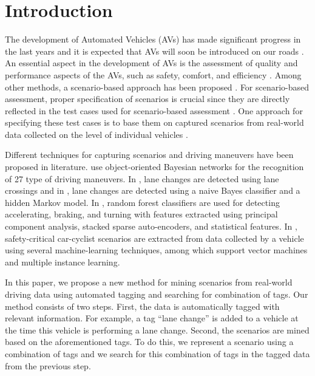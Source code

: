 \section{Introduction}
\label{sec:introduction}

\cstarta
The development of Automated Vehicles (AVs) has made significant progress in the last years and it is expected that AVs will soon be introduced on our roads \autocite{bimbraw2015autonomous, madni2018autonomous}. 
An essential aspect in the development of AVs is the assessment of quality and performance aspects of the AVs, such as safety, comfort, and efficiency \autocite{bengler2014threedecades, stellet2015taxonomy}. 
Among other methods, a scenario-based approach has been proposed \autocite{elrofai2018scenario, putz2017pegasus}. 
For scenario-based assessment, proper specification of scenarios is crucial since they are directly reflected in the test cases used for scenario-based assessment \autocite{stellet2015taxonomy}. 
One approach for specifying these test cases is to base them on captured scenarios from real-world data collected on the level of individual vehicles \autocite{elrofai2018scenario, putz2017pegasus, roesener2016scenariobased, deGelder2017assessment}. 

Different techniques for capturing scenarios and driving maneuvers have been proposed in literature. 
\textcite{kasper2012oobayesnetworks} use object-oriented Bayesian networks for the recognition of 27 type of driving maneuvers. 
In \autocite{krajewski2018highD}, lane changes are detected using lane crossings and in \autocite{schlechtriemen2015lanechange}, lane changes are detected using a naive Bayes classifier and a hidden Markov model. 
In \cite{xie2017driving}, random forest classifiers are used for detecting accelerating, braking, and turning with features extracted using principal component analysis, stacked sparse auto-encoders, and statistical features.
In \autocite{cara2015carcyclist}, safety-critical car-cyclist scenarios are extracted from data collected by a vehicle using several machine-learning techniques, among which support vector machines and multiple instance learning.

In this paper, we propose a new method for mining scenarios from real-world driving data using automated tagging and searching for combination of tags. 
Our method consists of two steps. 
First, the data is automatically tagged with relevant information. For example, a tag ``lane change'' is added to a vehicle at the time this vehicle is performing a lane change. 
Second, the scenarios are mined based on the aforementioned tags. \cenda
\cstartd To do this, we represent a scenario using a combination of tags and we search for this combination of tags in the tagged data from the previous step. \cendd

